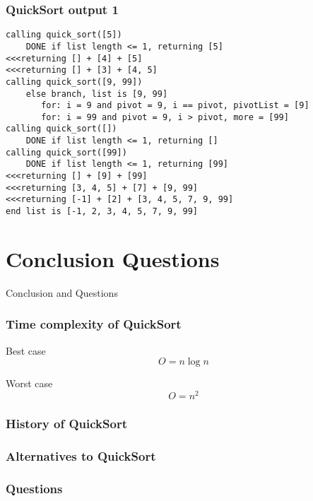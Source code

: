 \documentclass{beamer}
\begin{document}
    \begin{frame}[fragile]
        \frametitle{QuickSort output 1}
        \scriptsize
        \begin{verbatim}
calling quick_sort([5])
    DONE if list length <= 1, returning [5]
<<<returning [] + [4] + [5]
<<<returning [] + [3] + [4, 5]
calling quick_sort([9, 99])
    else branch, list is [9, 99]
       for: i = 9 and pivot = 9, i == pivot, pivotList = [9]
       for: i = 99 and pivot = 9, i > pivot, more = [99]
calling quick_sort([])
    DONE if list length <= 1, returning []
calling quick_sort([99])
    DONE if list length <= 1, returning [99]
<<<returning [] + [9] + [99]
<<<returning [3, 4, 5] + [7] + [9, 99]
<<<returning [-1] + [2] + [3, 4, 5, 7, 9, 99]
end list is [-1, 2, 3, 4, 5, 7, 9, 99]
        \end{verbatim}
    \end{frame}

\section{Conclusion Questions}
\begin{frame}
    \LARGE Conclusion and Questions
\end{frame}

    \begin{frame}
        \frametitle{Time complexity of QuickSort}
        \par Best case
        \begin{equation}
            O = n \log n
        \end{equation}
        \par Worst case
        \begin{equation}
            O = n^2
        \end{equation}

    \end{frame}

    \begin{frame}
        \frametitle{History of QuickSort}

    \end{frame}

    \begin{frame}
        \frametitle{Alternatives to QuickSort}

    \end{frame}

    \begin{frame}
        \frametitle{Questions}

    \end{frame}
\end{document}
